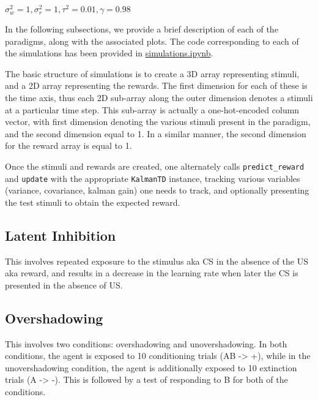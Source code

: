 \documentclass[11pt]{article}
\begin{document}
\begin{center}
\(\displaystyle \sigma_w^2 = 1, \sigma_r^2 = 1, \tau^2 = 0.01, \gamma = 0.98\)
\end{center}

In the following subsections, we provide a brief description of each of the paradigms, along with the associated plots. The code corresponding to each of the simulations has been provided in \url{simulations.ipynb}.

The basic structure of simulations is to create a 3D array representing stimuli, and a 2D array representing the rewards. The first dimension for each of these is the time axis, thus each 2D sub-array along the outer dimension denotes a stimuli at a particular time step. This sub-array is actually a one-hot-encoded column vector, with first dimension denoting the various stimuli present in the paradigm, and the second dimension equal to 1. In a similar manner, the second dimension for the reward array is equal to 1.

Once the stimuli and rewards are created, one alternately calls \texttt{predict\_reward} and \texttt{update} with the appropriate \texttt{KalmanTD} instance, tracking various variables (variance, covariance, kalman gain) one needs to track, and optionally presenting the test stimuli to obtain the expected reward.

\newpage

\subsection{Latent Inhibition}
\label{sec:orgc79fef3}

This involves repeated exposure to the stimulus aka CS in the absence of the US aka reward, and results in a decrease in the learning rate when later the CS is presented in the absence of US.

\begin{center}

\end{center}

\newpage

\subsection{Overshadowing}
\label{sec:orgdfd99a3}

This involves two conditions: overshadowing and unovershadowing. In both conditions, the agent is exposed to 10 conditioning trials (AB -> +), while in the unovershadowing condition, the agent is additionally exposed to 10 extinction trials (A -> -). This is followed by a test of responding to B for both of the conditions.
\end{document}
